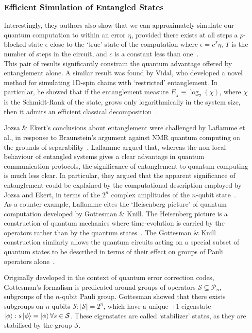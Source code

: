 \documentclass{standalone}
\begin{document}
\subsubsection{Efficient Simulation of Entangled States}\label{sec:gk}
Interestingly, they authors also show that we can approximately simulate our quantum computation to within an error $\eta$, provided there exists at all steps a $p$-blocked state $\epsilon$-close to the `true' state of the computation where $\epsilon=c^{T}\eta$, $T$ is the number of steps in the circuit, and $c$ is a constant less than one~\cite{Jozsa2003}. \\
This pair of results significantly constrain the quantum advantage offered by entanglement alone. A similar result was found by Vidal, who developed a novel method for simulating 1D-spin chains with `restricted' entanglement. In particular, he showed that if the entanglement measure $E_{\chi}\equiv\log_{2}(\chi)$, where $\chi$ is the Schmidt-Rank of the state, grows only logarithmically in the system size, then it admits an efficient classical decomposition~\cite{Vidal2003}.
\par
Jozsa \& Ekert's conclusions about entanglement were challenged by Laflamme et al., in response to Braunstein's argument against NMR quantum computing on the grounds of separability~\cite{Laflamme2001}. Laflamme argued that, whereas the non-local behaviour of entangled systems gives a clear advantage in quantum communication protocols, the significance of entanglement to quantum computing is much less clear. In particular, they argued that the apparent significance of entanglement could be explained by the computational description employed by Jozsa and Ekert, in terms of the $2^{n}$ complex amplitudes of the $n$-qubit state~\cite{Laflamme2001}.\\
As a counter example, Laflamme cites the `Heisenberg picture' of quantum computation developed by Gottesman \& Knill. The Heisenberg picture is a construction of quantum mechanics where time-evolution is carried by the operators rather than by the quantum states~\cite{Nielsen2000}. The Gottesman \& Knill construction similarly allows the quantum circuits acting on a special subset of quantum states to be described in terms of their effect on groups of Pauli operators alone~\cite{Gottesman1999a}. 
\par
Originally developed in the context of quantum error correction codes, Gottesman's formalism is predicated around groups of operators $\mathcal{S}\subseteq\mathcal{P}_{n}$, subgroups of the $n$-qubit Pauli group. Gottesman showed that there exists subgroups on $n$ qubits $\mathcal{S}:\vert\mathcal{S}\vert=2^{n}$, which have a unique +1 eigenstate $\ket{\phi}:s\ket{\phi}=\ket{\phi}\forall s\in\mathcal{S}$. These eigenstates are called `stabilizer' states, as they are stabilised by the group $\mathcal{S}$.\\
\end{document}
